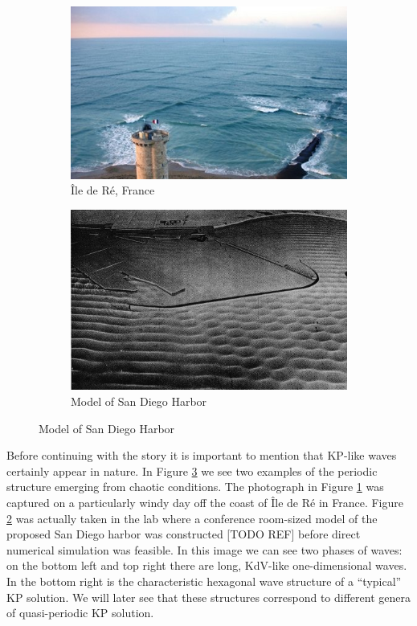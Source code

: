 \begin{figure}
  \centering
  \begin{subfigure}[b]{0.45\textwidth}
    \includegraphics[width=\textwidth]{images/livekp.jpg}
    \caption{\^{I}le de R\'{e}, France}
    \label{fig:ile-de-re}
  \end{subfigure}

  \begin{subfigure}[b]{0.45\textwidth}
    \centering
    \includegraphics[width=\textwidth]{images/sd-harbor-model.jpg}
    \caption{Model of San Diego Harbor}
    \label{fig:san-diego-harbor}
  \end{subfigure}
  \label{fig:real-life}
\end{figure}

Before continuing with the story it is important to mention that KP-like waves
certainly appear in nature. In Figure \ref{fig:real-life} we see two examples of
the periodic structure emerging from chaotic conditions. The photograph in
Figure \ref{fig:ile-de-re} was captured on a particularly windy day off the
coast of \^{I}le de R\'{e} in France. Figure \ref{fig:san-diego-harbor} was
actually taken in the lab where a conference room-sized model of the proposed
San Diego harbor was constructed [TODO REF] before direct numerical simulation
was feasible. In this image we can see two phases of waves: on the bottom left
and top right there are long, KdV-like one-dimensional waves. In the bottom
right is the characteristic hexagonal wave structure of a ``typical'' KP
solution. We will later see that these structures correspond to different genera
of quasi-periodic KP solution.

